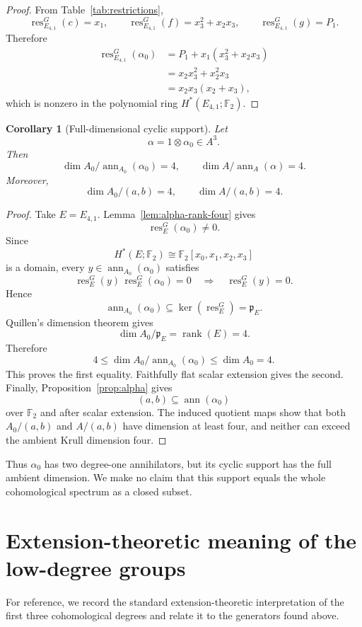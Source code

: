 \documentclass[11pt]{amsart}
\newtheorem{corollary}[theorem]{Corollary}
\theoremstyle{definition}
\theoremstyle{remark}
\DeclareMathOperator{\ann}{ann}
\DeclareMathOperator{\rank}{rank}
\DeclareMathOperator{\res}{res}
\newcommand{\F}{\mathbb F}
\begin{document}
\begin{proof}
From Table~\ref{tab:restrictions},
\[
\res^G_{E_{4,1}}(c)=x_1,
\qquad
\res^G_{E_{4,1}}(f)=x_3^2+x_2x_3,
\qquad
\res^G_{E_{4,1}}(g)=P_1.
\]
Therefore
\begin{align*}
\res^G_{E_{4,1}}(\alpha_0)
&=P_1+x_1(x_3^2+x_2x_3)\\
&=x_2x_3^2+x_2^2x_3\\
&=x_2x_3(x_2+x_3),
\end{align*}
which is nonzero in the polynomial ring $H^*(E_{4,1};\F_2)$.
\end{proof}

\begin{corollary}[Full-dimensional cyclic support]
\label{cor:full-dimensional-support}
Let
\[
\alpha=1\otimes\alpha_0\in A^3.
\]
Then
\[
\dim A_0/\ann_{A_0}(\alpha_0)=4,
\qquad
\dim A/\ann_A(\alpha)=4.
\]
Moreover,
\[
\dim A_0/(a,b)=4,
\qquad
\dim A/(a,b)=4.
\]
\end{corollary}

\begin{proof}
Take $E=E_{4,1}$.  Lemma~\ref{lem:alpha-rank-four} gives
\[
\res^G_E(\alpha_0)\neq0.
\]
Since
\[
H^*(E;\F_2)\cong\F_2[x_0,x_1,x_2,x_3]
\]
is a domain, every $y\in\ann_{A_0}(\alpha_0)$ satisfies
\[
\res^G_E(y)\,\res^G_E(\alpha_0)=0
\quad\Longrightarrow\quad
\res^G_E(y)=0.
\]
Hence
\[
\ann_{A_0}(\alpha_0)\subseteq\ker(\res^G_E)=\mathfrak p_E.
\]
Quillen's dimension theorem gives
\[
\dim A_0/\mathfrak p_E=\rank(E)=4.
\]
Therefore
\[
4\leq\dim A_0/\ann_{A_0}(\alpha_0)\leq\dim A_0=4.
\]
This proves the first equality.  Faithfully flat scalar extension gives the second.  Finally, Proposition~\ref{prop:alpha} gives
\[
(a,b)\subseteq\ann(\alpha_0)
\]
over $\F_2$ and after scalar extension.  The induced quotient maps show that both $A_0/(a,b)$ and $A/(a,b)$ have dimension at least four, and neither can exceed the ambient Krull dimension four.
\end{proof}

Thus $\alpha_0$ has two degree-one annihilators, but its cyclic support has the full ambient dimension.  We make no claim that this support equals the whole cohomological spectrum as a closed subset.

\section{Extension-theoretic meaning of the low-degree groups}
\label{sec:meaning}

For reference, we record the standard extension-theoretic interpretation of the first three cohomological degrees and relate it to the generators found above.
\end{document}
